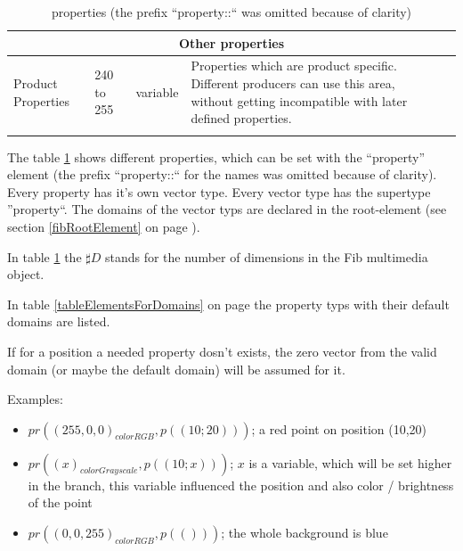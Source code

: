 \begin{center}
\begin{longtable}{|p{25mm}|p{6mm}|p{6mm}|p{50mm}|p{35mm}|}
	\multicolumn{5}{|c|}{\textbf{Other properties}}\\\hline
	Product Properties & 240 to 255 & va\-ri\-able & Properties which are product specific. Different producers can use this area, without getting incompatible with later defined properties. & \\\hline

\caption{properties (the prefix ``property::`` was omitted because of clarity)}
\label{tablePropertyNamen}
\end{longtable}
\end{center}




The table \ref{tablePropertyNamen} shows different properties, which can be set with the ``property'' element (the prefix ``property::`` for the names was omitted because of clarity). Every property has it's own vector type. Every vector type has the supertype ''property``. The domains of the vector typs are declared in the root-element (see section \ref{fibRootElement} on page \pageref{fibRootElement}).

In table \ref{tablePropertyNamen} the $\sharp D$ stands for the number of dimensions in the Fib multimedia object.

In table \ref{tableElementsForDomains} on page \pageref{tableElementsForDomains} the property typs with their default domains are listed.

If for a position a needed property dosn't exists, the zero vector from the valid domain (or maybe the default domain) will be assumed for it.

\bigskip\noindent
Examples:
\begin{itemize}
 \item $pr( (255, 0, 0)_{colorRGB}, p((10;20)) )$; a red point on position (10,20)
 \item $pr( (x)_{colorGrayscale}, p((10;x)) )$; $x$ is a variable, which will be set higher in the branch, this variable influenced the position and also color / brightness of the point
 \item $pr( ( 0, 0, 255)_{colorRGB}, p(()) )$; the whole background is blue
\end{itemize}


